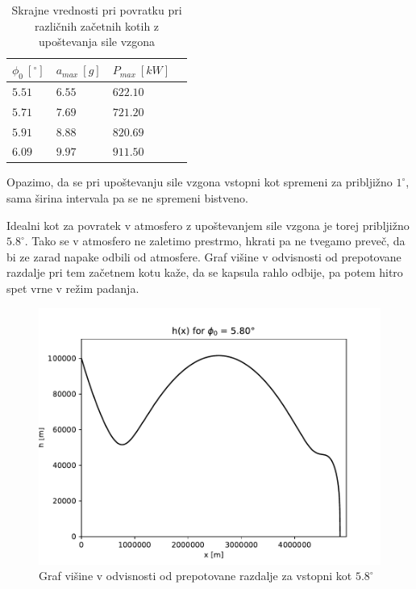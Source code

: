 \documentclass[11pt,a4paper]{article}
\begin{document}
\begin{table}[H]
	\centering
	\caption{Skrajne vrednosti pri povratku pri razli\v cnih za\v cetnih kotih z upo\v stevanja sile vzgona}
	\vspace{0.3cm}
	\def\arraystretch{1.5}
	\begin{tabular}{l|lll}
	$ \phi_0\ [^\circ] $ & $a_{max}\ [g]$ & $ P_{max} \ [kW] $ \\
	\hline
	$ 5.51 $ & $ 6.55 $ & $ 622.10 $ \\
	$ 5.71 $ & $ 7.69 $ & $ 721.20 $ \\
	$ 5.91 $ & $ 8.88 $ & $ 820.69 $ \\
	$ 6.09 $ & $ 9.97 $ & $ 911.50 $
	\end{tabular}
	\def\arraystretch{1}
\end{table}

Opazimo, da se pri upo\v stevanju sile vzgona vstopni kot spremeni za priblji\v zno $ 1^\circ $, sama \v sirina intervala pa se ne spremeni bistveno.


Idealni kot za povratek v atmosfero z upo\v stevanjem sile vzgona je torej priblji\v zno $ 5.8^\circ $. Tako se v atmosfero ne zaletimo prestrmo, hkrati pa ne tvegamo preve\v c, da bi ze zarad napake odbili od atmosfere. Graf vi\v sine v odvisnosti od prepotovane razdalje pri tem za\v cetnem kotu ka\v ze, da se kapsula rahlo odbije, pa potem hitro spet vrne v re\v zim padanja.

\begin{figure}[H]
  \begin{center}
  	\includegraphics[width=12cm]{5_8_height_over_x.pdf}
    \caption{Graf vi\v sine v odvisnosti od prepotovane razdalje za vstopni kot $ 5.8^\circ $}
  \end{center}
\end{figure}
\end{document}
